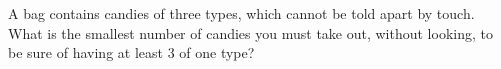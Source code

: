 A bag contains candies of three types, which cannot be told apart by touch. What is the smallest number of candies you must take out, without looking, to be sure of having at least $3$ of one type?

